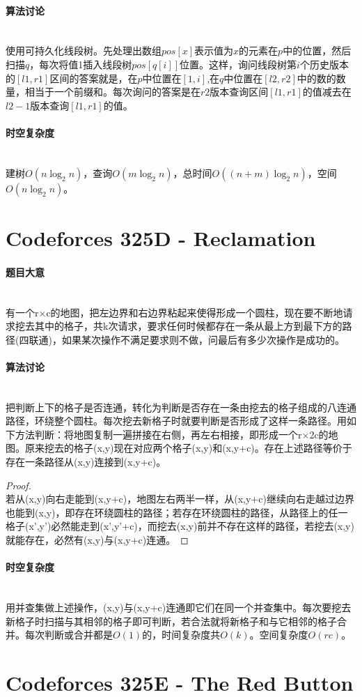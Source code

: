 \documentclass[UTF8]{ctexart}
\newcommand{\myparagraph}[1]{\paragraph{#1}\mbox{}\\}
\theoremstyle{nonumberplain}
\newtheorem{proof}{\hspace{1em}证明：}
\begin{document}
		\myparagraph{算法讨论}
		
			使用可持久化线段树。先处理出数组$pos[x]$表示值为$x$的元素在$p$中的位置，然后扫描$q$，每次将值1插入线段树$pos[q[i]]$位置。这样，询问线段树第$i$个历史版本的$[l1,r1]$区间的答案就是，在$p$中位置在$[1,i]$,在$q$中位置在$[l2,r2]$中的数的数量，相当于一个前缀和。每次询问的答案是在$r2$版本查询区间$[l1,r1]$的值减去在$l2-1$版本查询$[l1,r1]$的值。
	
		\myparagraph{时空复杂度}
		
			建树$O(n\log_2n)$，查询$O(m\log_2n)$，总时间$O((n+m)\log_2n)$，空间$O(n\log_2n)$。
	
	\section{Codeforces 325D - Reclamation}
		
		\myparagraph{题目大意}
		
			有一个r×c的地图，把左边界和右边界粘起来使得形成一个圆柱，现在要不断地请求挖去其中的格子，共k次请求，要求任何时候都存在一条从最上方到最下方的路径(四联通)，如果某次操作不满足要求则不做，问最后有多少次操作是成功的。
		
		\myparagraph{算法讨论}
		
			把判断上下的格子是否连通，转化为判断是否存在一条由挖去的格子组成的八连通路径，环绕整个圆柱。每次挖去新格子时就要判断是否形成了这样一条路径。用如下方法判断：将地图复制一遍拼接在右侧，再左右相接，即形成一个r×2c的地图。原来挖去的格子(x,y)现在对应两个格子(x,y)和(x,y+c)。存在上述路径等价于存在一条路径从(x,y)连接到(x,y+c)。
			
			\begin{proof}\mbox{}\\
			
				若从(x,y)向右走能到(x,y+c)，地图左右两半一样，从(x,y+c)继续向右走越过边界也能到(x,y)，即存在环绕圆柱的路径；若存在环绕圆柱的路径，从路径上的任一格子(x',y')必然能走到(x',y'+c)，而挖去(x,y)前并不存在这样的路径，若挖去(x,y)就能存在，必然有(x,y)与(x,y+c)连通。
			
			\end{proof}
		
		\myparagraph{时空复杂度}
		
			用并查集做上述操作，(x,y)与(x,y+c)连通即它们在同一个并查集中。每次要挖去新格子时扫描与其相邻的格子即可判断，若合法就将新格子和与它相邻的格子合并。每次判断或合并都是$O(1)$的，时间复杂度共$O(k)$。空间复杂度$O(rc)$。
	
	\section{Codeforces 325E - The Red Button}
	
\end{document}
